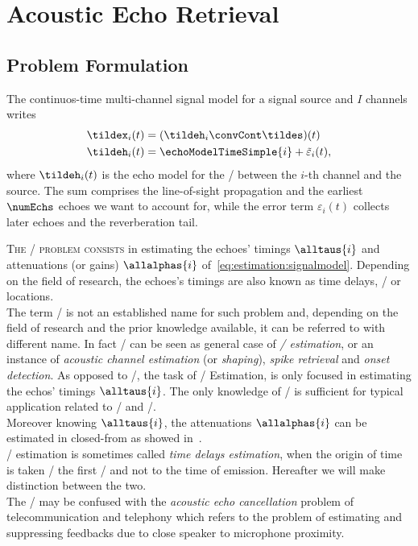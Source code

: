 \chapter{Acoustic Echo Retrieval}\label{ch:estimation}
\vspace{-2.5em}
\synopsisChEstimation

\section{Problem Formulation}\label{sec:estimation:problem}
The continuos-time multi-channel signal model for a signal source and $I$ channels writes
\begin{equation}\label{eq:estimation:signalmodel}
    \begin{aligned}
        \tildex_i(t) &= (\tildeh_i \convCont \tildes)(t) \\
        \tildeh_i(t) &= \echoModelTimeSimple{i} + \tilde{\varepsilon}_i(t),
    \end{aligned}
\end{equation}
where $\tildeh_i(t)$ is the echo model for the \RIR/ between the $i$-th channel and the source.
The sum comprises the line-of-sight propagation and the earliest $\numEchs$ echoes we want to account for, while the error term $\varepsilon_i(t)$ collects later echoes and the reverberation tail.

\mynewline
\textsc{The \AERdef/ problem consists} in estimating the echoes' timings $\alltaus{i}$ and attenuations (or gains) $\allalphas{i}$ of~\cref{eq:estimation:signalmodel}.
Depending on the field of research, the echoes's timings are also known as time delays, \TOAdef/ or locations.
\\The term \AER/ is not an established name for such problem and, depending on the field of research and the prior knowledge available, it can be referred to with different name.
In fact \AER/ can be seen as general case of \textit{\TOAs/ estimation}, or an instance of \textit{acoustic channel estimation} (or \textit{shaping}), \textit{spike retrieval} and \textit{onset detection}.
As opposed to \AER/, the task of \TOAs/ Estimation, is only focused in estimating the echos' timings $\alltaus{i}$.
The only knowledge of \TOAs/ is sufficient for typical application related to \SSL/ and \RooGE/.
\\Moreover knowing $\alltaus{i}$, the attenuations $\allalphas{i}$ can be estimated in closed-from as showed in~.
\\\TOAs/ estimation is sometimes called \textit{time delays estimation}, when the origin of time is taken \wrt/ the first \TOA/ and not to the time of emission.
Hereafter we will make distinction between the two.
\\The \AER/ may be confused with the \textit{acoustic echo cancellation} problem of telecommunication and telephony which refers to the problem of estimating and suppressing feedbacks due to close speaker to microphone proximity.

